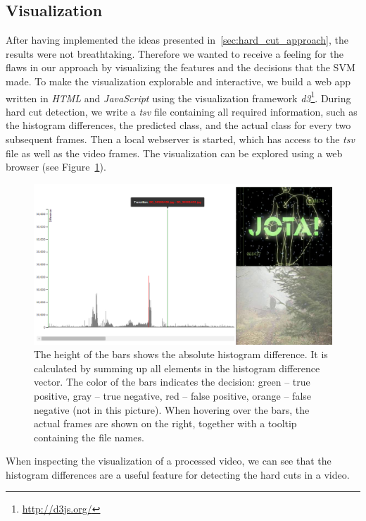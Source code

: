 \subsection{Visualization}
\label{sec:hard_cut_visualization}

After having implemented the ideas presented in~\ref{sec:hard_cut_approach}, the results were not breathtaking.
Therefore we wanted to receive a feeling for the flaws in our approach by visualizing the features and the decisions that the SVM made.
To make the visualization explorable and interactive, we build a web app written in \emph{HTML} and \emph{JavaScript} using the visualization framework \emph{d3}\footnote{\url{http://d3js.org/}}.
During hard cut detection, we write a \emph{tsv} file containing all required information, such as the histogram differences, the predicted class, and the actual class for every two subsequent frames.
Then a local webserver is started, which has access to the \emph{tsv} file as well as the video frames.
The visualization can be explored using a web browser (see Figure~\ref{fig:hard_cut_visualization}).
\begin{figure}[ht]
	\centering
	\includegraphics[scale=.3]{images/hard_cut_visualization2.png}
	\caption{The height of the bars shows the absolute histogram difference.
    It is calculated by summing up all elements in the histogram difference vector.
    The color of the bars indicates the decision: green -- true positive, gray -- true negative, red -- false positive, orange -- false negative (not in this picture).
    When hovering over the bars, the actual frames are shown on the right, together with a tooltip containing the file names.}
	\label{fig:hard_cut_visualization}
\end{figure}
When inspecting the visualization of a processed video, we can see that the histogram differences are a useful feature for detecting the hard cuts in a video.
